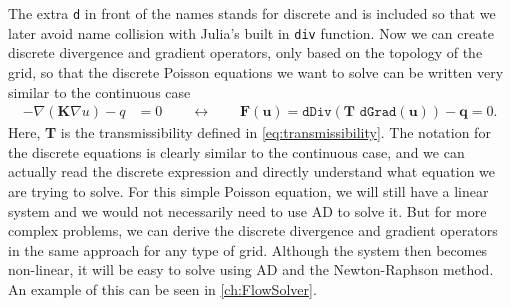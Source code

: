 The extra \texttt{d} in front of the names stands for discrete and is included so that we later avoid name collision with Julia's built in \texttt{div} function. Now we can create discrete divergence and gradient operators, only based on the topology of the grid, so that the discrete Poisson equations we want to solve can be written very similar to the continuous case
\begin{align*}
    -\nabla(\textbf{K}\nabla u) - q &= 0 \qquad \longleftrightarrow\qquad
    \textbf{F}(\textbf{u}) = \texttt{dDiv}(\textbf{T }\texttt{dGrad}(\textbf{u}))-\textbf{q} 
    = 0.
\end{align*}
Here, \textbf{T} is the transmissibility defined in \eqref{eq:transmissibility}. The notation for the discrete equations is clearly similar to the continuous case, and we can actually read the discrete expression and directly understand what equation we are trying to solve. For this simple Poisson equation, we will still have a linear system and we would not necessarily need to use AD to solve it. But for more complex problems, we can derive the discrete divergence and gradient operators in the same approach for any type of grid. Although the system then becomes non-linear, it will be easy to solve using AD and the Newton-Raphson method. An example of this can be seen in \autoref{ch:FlowSolver}.
